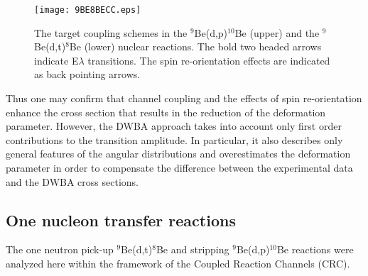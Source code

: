 \documentclass[10pt]{iopart}
\begin{document}
\begin{figure}[bp]
\centering
\texttt{[image: 9BE8BECC.eps]}
\caption{ \label{9BE8BECC} The target coupling schemes in the ${}^9$Be(d,p)$^{10}$Be (upper) and the ${}^9$Be(d,t)$^8$Be (lower) nuclear reactions. The bold two headed arrows indicate E$\lambda$ transitions. The spin re-orientation effects are indicated as back pointing arrows.}
\end{figure}	

Thus one may confirm that channel coupling and the effects of spin re-orientation enhance the cross section that results in the reduction of the deformation parameter. However, the DWBA approach takes into account only first order contributions to the transition amplitude. In particular, it also describes only general features of the angular distributions and overestimates the deformation parameter in order to compensate the difference between the experimental data and the DWBA cross sections.



\subsection{One nucleon transfer reactions }
The one neutron pick-up ${}^9$Be(d,t)${}^8$Be and stripping ${}^9$Be(d,p)${}^{10}$Be reactions were analyzed here within the framework of  the Coupled Reaction Channels (CRC).
\end{document}
